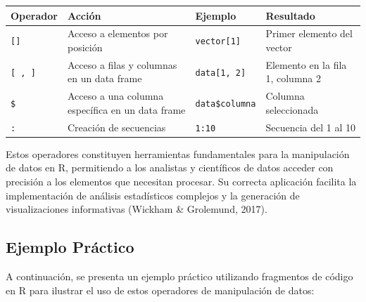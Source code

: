 \documentclass[
  spanish,
  a4paper,
  DIV=11,
  numbers=noendperiod,
  onepage,
  openany]{scrreprt}
\begin{document}
\begin{longtable}[]{@{}
  >{\raggedright\arraybackslash}p{}
  >{\raggedright\arraybackslash}p{}
  >{\raggedright\arraybackslash}p{}
  >{\raggedright\arraybackslash}p{}@{}}
\toprule\noalign{}
\begin{minipage}[b]{\linewidth}\raggedright
\textbf{Operador}
\end{minipage} & \begin{minipage}[b]{\linewidth}\raggedright
\textbf{Acción}
\end{minipage} & \begin{minipage}[b]{\linewidth}\raggedright
\textbf{Ejemplo}
\end{minipage} & \begin{minipage}[b]{\linewidth}\raggedright
\textbf{Resultado}
\end{minipage} \\
\midrule\noalign{}
\endhead
\bottomrule\noalign{}
\endlastfoot
\texttt{{[}{]}} & Acceso a elementos por posición &
\texttt{vector{[}1{]}} & Primer elemento del vector \\
\texttt{{[}\ ,\ {]}} & Acceso a filas y columnas en un data frame &
\texttt{data{[}1,\ 2{]}} & Elemento en la fila 1, columna 2 \\
\texttt{\$} & Acceso a una columna específica en un data frame &
\texttt{data\$columna} & Columna seleccionada \\
\texttt{:} & Creación de secuencias & \texttt{1:10} & Secuencia del 1 al
10 \\
\end{longtable}

Estos operadores constituyen herramientas fundamentales para la
manipulación de datos en R, permitiendo a los analistas y científicos de
datos acceder con precisión a los elementos que necesitan procesar. Su
correcta aplicación facilita la implementación de análisis estadísticos
complejos y la generación de visualizaciones informativas (Wickham \&
Grolemund, 2017).

\subsection{Ejemplo Práctico}\label{ejemplo-pruxe1ctico-2}

A continuación, se presenta un ejemplo práctico utilizando fragmentos de
código en R para ilustrar el uso de estos operadores de manipulación de
datos:
\end{document}
